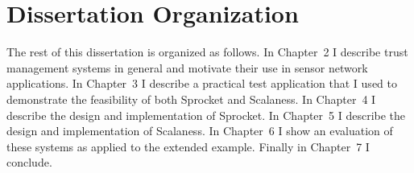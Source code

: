 \section{Dissertation Organization}

The rest of this dissertation is organized as follows. In Chapter~2 I describe trust management
systems in general and motivate their use in sensor network applications. In Chapter~3 I
describe a practical test application that I used to demonstrate the feasibility of both
Sprocket and Scalaness. In Chapter~4 I describe the design and implementation of Sprocket. In
Chapter~5 I describe the design and implementation of Scalaness. In Chapter~6 I show an
evaluation of these systems as applied to the extended example. Finally in Chapter~7 I conclude.

